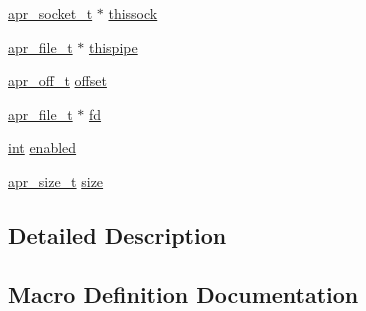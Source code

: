 \begin{DoxyCompactItemize}
\item 
\hyperlink{structapr__socket__t}{apr\+\_\+socket\+\_\+t} $\ast$ \hyperlink{group__APR__Util__Bucket__Brigades_ga631505071f80c4cbf2dd302e706b0552}{thissock}
\item 
\hyperlink{structapr__file__t}{apr\+\_\+file\+\_\+t} $\ast$ \hyperlink{group__APR__Util__Bucket__Brigades_gacaa691aff7fb9da8a60b463c0487140c}{thispipe}
\item 
\hyperlink{group__apr__platform_ga6938af9075cec15c88299109381aa984}{apr\+\_\+off\+\_\+t} \hyperlink{group__APR__Util__Bucket__Brigades_ga0feae9f93d4bc5dca392194c513e0921}{offset}
\item 
\hyperlink{structapr__file__t}{apr\+\_\+file\+\_\+t} $\ast$ \hyperlink{group__APR__Util__Bucket__Brigades_gae38fbe4f355ac2094e78a8762aa51d02}{fd}
\item 
\hyperlink{pcre_8txt_a42dfa4ff673c82d8efe7144098fbc198}{int} \hyperlink{group__APR__Util__Bucket__Brigades_ga03e6cca0c879c0443efb431c30c14f76}{enabled}
\item 
\hyperlink{group__apr__platform_gaaa72b2253f6f3032cefea5712a27540e}{apr\+\_\+size\+\_\+t} \hyperlink{group__APR__Util__Bucket__Brigades_ga5f598d678d0ca77c25732a145c68d3c7}{size}
\end{DoxyCompactItemize}


\subsection{Detailed Description}


\subsection{Macro Definition Documentation}
